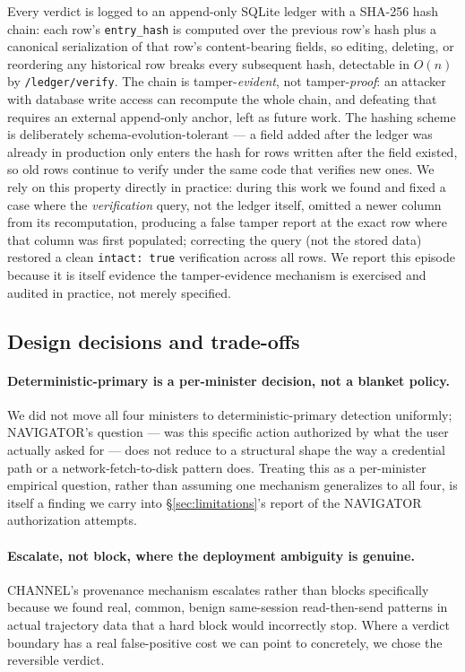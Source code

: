 \documentclass[sigconf,anonymous,review]{acmart}
\begin{document}
Every verdict is logged to an append-only SQLite ledger with a SHA-256 hash
chain: each row's \texttt{entry\_hash} is computed over the previous row's
hash plus a canonical serialization of that row's content-bearing fields, so
editing, deleting, or reordering any historical row breaks every subsequent
hash, detectable in $O(n)$ by \texttt{/ledger/verify}. The chain is
tamper-\emph{evident}, not tamper-\emph{proof}: an attacker with database
write access can recompute the whole chain, and defeating that requires an
external append-only anchor, left as future work. The hashing scheme is
deliberately schema-evolution-tolerant --- a field added after the ledger was
already in production only enters the hash for rows written after the field
existed, so old rows continue to verify under the same code that verifies
new ones. We rely on this property directly in practice: during this work we
found and fixed a case where the \emph{verification} query, not the ledger
itself, omitted a newer column from its recomputation, producing a false
tamper report at the exact row where that column was first populated;
correcting the query (not the stored data) restored a clean
\texttt{intact: true} verification across all rows. We report this
episode because it is itself evidence the tamper-evidence mechanism is
exercised and audited in practice, not merely specified.

\subsection{Design decisions and trade-offs}

\paragraph{Deterministic-primary is a per-minister decision, not a blanket
policy.} We did not move all four ministers to deterministic-primary
detection uniformly; NAVIGATOR's question --- was this specific action
authorized by what the user actually asked for --- does not reduce to a
structural shape the way a credential path or a network-fetch-to-disk
pattern does. Treating this as a per-minister empirical question, rather
than assuming one mechanism generalizes to all four, is itself a finding we
carry into \S\ref{sec:limitations}'s report of the NAVIGATOR authorization
attempts.

\paragraph{Escalate, not block, where the deployment ambiguity is genuine.}
CHANNEL's provenance mechanism escalates rather than blocks specifically
because we found real, common, benign same-session read-then-send patterns
in actual trajectory data that a hard block would incorrectly stop. Where a
verdict boundary has a real false-positive cost we can point to concretely,
we chose the reversible verdict.
\end{document}
